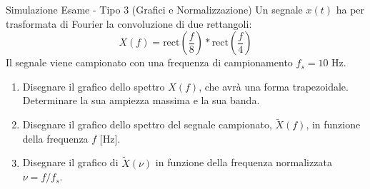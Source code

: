 
\begin{esercizio}{Simulazione Esame - Tipo 3 (Grafici e Normalizzazione)}
    Un segnale $x(t)$ ha per trasformata di Fourier la convoluzione di due rettangoli:
    \[
        X(f) = \text{rect}\left(\frac{f}{8}\right) * \text{rect}\left(\frac{f}{4}\right)
    \]
    Il segnale viene campionato con una frequenza di campionamento $f_s = 10$ Hz.
    
    \begin{enumerate}
        \item Disegnare il grafico dello spettro $X(f)$, che avrà una forma trapezoidale. Determinare la sua ampiezza massima e la sua banda.
        \item Disegnare il grafico dello spettro del segnale campionato, $\tilde{X}(f)$, in funzione della frequenza $f$ [Hz].
        \item Disegnare il grafico di $\tilde{X}(\nu)$ in funzione della frequenza normalizzata $\nu = f/f_s$.
    \end{enumerate}
\end{esercizio}
